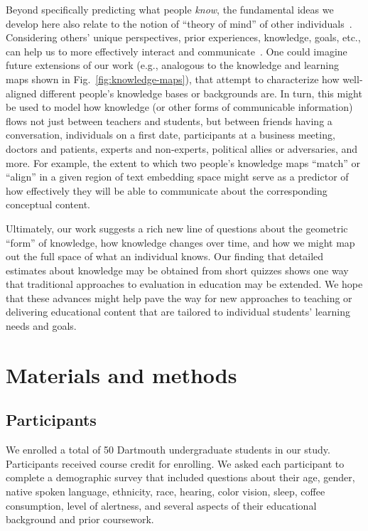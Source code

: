 \documentclass[10pt]{article}
\begin{document}
Beyond specifically predicting what people \textit{know}, the fundamental ideas
we develop here also relate to the notion of ``theory of mind'' of other
individuals~\citep{GoldWinn12, KansEtal15, Melt11}. Considering others' unique
perspectives, prior experiences, knowledge, goals, etc., can help us to more
effectively interact and communicate~\citep{ShaoEtal18, StepBaer06, Ratk18}.
One could imagine future extensions of our work (e.g., analogous to the
knowledge and learning maps shown in Fig.~\ref{fig:knowledge-maps}), that
attempt to characterize how well-aligned different people's knowledge bases or
backgrounds are. In turn, this might be used to model how knowledge (or other
forms of communicable information) flows not just between teachers and
students, but between friends having a conversation, individuals on a first
date, participants at a business meeting, doctors and patients, experts and
non-experts, political allies or adversaries, and more. For example, the extent
to which two people's knowledge maps ``match'' or ``align'' in a given region
of text embedding space might serve as a predictor of how effectively they
will be able to communicate about the corresponding conceptual content.

Ultimately, our work suggests a rich new line of questions about the geometric
``form'' of knowledge, how knowledge changes over time, and how we might map
out the full space of what an individual knows. Our finding that detailed
estimates about knowledge may be obtained from short quizzes shows one way that
traditional approaches to evaluation in education may be extended. We hope
that these advances might help pave the way for new approaches to teaching or
delivering educational content that are tailored to individual students'
learning needs and goals.

\section*{Materials and methods}

\subsection*{Participants}

We enrolled a total of 50 Dartmouth undergraduate students in our study.
Participants received course credit for enrolling. We asked each participant to
complete a demographic survey that included questions about their age, gender,
native spoken language, ethnicity, race, hearing, color vision, sleep, coffee
consumption, level of alertness, and several aspects of their educational
background and prior coursework.
\end{document}
